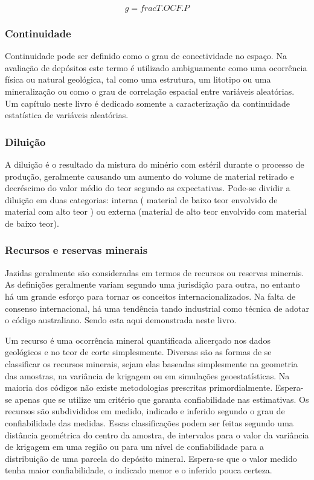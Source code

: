      \begin{equation}\label{Fluxo_caixa}
     g = frac{T.OC}{F.P}
     \end{equation} 
     
     \subsubsection{Continuidade}
     
     Continuidade pode ser definido como o grau de conectividade no espaço. Na avaliação de depósitos este termo é utilizado ambiguamente como uma ocorrência física ou natural geológica, tal como uma estrutura, um litotipo ou uma mineralização ou como o grau de correlação espacial entre variáveis aleatórias. Um capítulo neste livro é dedicado somente a caracterização da continuidade estatística de variáveis aleatórias.
     
     \subsubsection{Diluição}
     
     A diluição é o resultado da mistura do minério com estéril durante o processo de produção, geralmente causando um aumento do volume de material retirado e decréscimo do valor médio do teor segundo as expectativas. Pode-se dividir a diluição em duas categorias: interna ( material de baixo teor envolvido de material com alto teor ) ou externa (material de alto teor envolvido com material de baixo teor). 
     
     \subsubsection{Recursos e reservas minerais}
     
     Jazidas geralmente são consideradas em termos de recursos ou reservas minerais. As definições geralmente variam segundo uma jurisdição para outra, no entanto há um grande esforço para tornar os conceitos internacionalizados. Na falta de consenso internacional, há uma tendência tando industrial como técnica de adotar o código australiano. Sendo esta aqui demonstrada neste livro. 
     
     Um recurso é uma ocorrência mineral quantificada alicerçado nos dados geológicos e no teor de corte simplesmente. Diversas são as formas de se classificar os recursos minerais, sejam elas baseadas simplesmente na geometria das amostras, na variância de krigagem ou em simulações geoestatísticas. Na maioria dos códigos não existe metodologias prescritas primordialmente. Espera-se apenas que se utilize um critério que garanta confiabilidade nas estimativas. Os recursos são subdivididos em medido, indicado e inferido segundo o grau de confiabilidade das medidas. Essas classificações podem ser feitas segundo uma distância geométrica do centro da amostra, de intervalos para o valor da variância de krigagem em uma região ou para um nível de confiabilidade para a distribuição de uma parcela do depósito mineral. Espera-se que o valor medido tenha maior confiabilidade, o indicado menor e o inferido pouca certeza.
          
